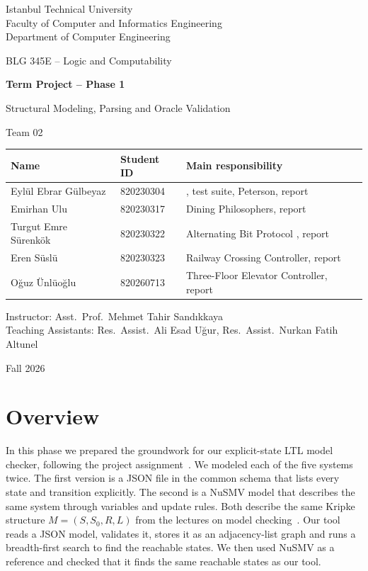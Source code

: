 \documentclass[11pt,a4paper]{article}
\newcommand{\teamno}{02}
\newcommand{\members}{%
  Eylül Ebrar Gülbeyaz      & 820230304 & \code{my_checker}, test suite, Peterson, report \\
  Emirhan Ulu        &  820230317 & Dining Philosophers, report \\
  Turgut Emre Sürenkök       & 820230322 & Alternating Bit Protocol , report\\
  Eren Süslü       & 820230323 & Railway Crossing Controller, report \\
  Oğuz Ünlüoğlu      & 820260713 & Three-Floor Elevator Controller, report \\
}
\DeclareRobustCommand{\code}{\codeurl}
\begin{document}
\begin{titlepage}
\centering
{\large Istanbul Technical University\\
Faculty of Computer and Informatics Engineering\\
Department of Computer Engineering\par}
\vspace{2.2cm}
{\Large BLG 345E -- Logic and Computability\par}
\vspace{0.6cm}
{\huge\bfseries Term Project -- Phase 1\par}
\vspace{0.3cm}
{\Large Structural Modeling, Parsing and Oracle Validation\par}
\vspace{1.6cm}
{\Large Team \teamno\par}
\vspace{0.8cm}
\begin{tabular}{lll}
\toprule
\textbf{Name} & \textbf{Student ID} & \textbf{Main responsibility}\\
\midrule
\members
\bottomrule
\end{tabular}
\vfill
{\large Instructor: Asst.\ Prof.\ Mehmet Tahir Sandıkkaya\\[2pt]
Teaching Assistants: Res.\ Assist.\ Ali Esad Uğur, Res.\ Assist.\ Nurkan Fatih Altunel\par}
\vspace{0.8cm}
{\large Fall 2026\par}
\end{titlepage}

\tableofcontents
\newpage

\section*{Overview}

In this phase we prepared the groundwork for our explicit-state LTL model
checker, following the project assignment~\cite{assignment}. We modeled each
of the five systems twice. The first version is a JSON file in the common
schema that lists every state and transition explicitly. The second is a
NuSMV model that describes the same system through variables and update rules.
Both describe the same Kripke structure $M=(S,S_0,R,L)$ from the lectures on
model checking~\cite{slides}. Our tool \code{my_checker} reads a JSON model,
validates it, stores it as an adjacency-list graph and runs a breadth-first
search to find the reachable states. We then used NuSMV as a reference and
checked that it finds the same reachable states as our tool.
\end{document}
